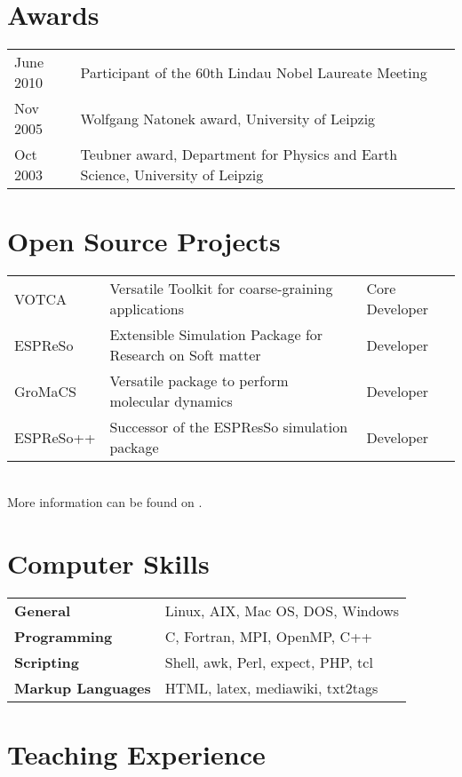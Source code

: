 \documentclass{article}
\begin{document}
\section*{Awards}

\begin{tabular}{ll}
June 2010 & Participant of the 60th Lindau Nobel Laureate Meeting\\
Nov 2005  & Wolfgang Natonek award, University of Leipzig\\
Oct 2003  & Teubner award, Department for Physics and Earth Science, University of Leipzig\\
\end{tabular}

\section*{Open Source Projects}

\begin{tabular}{lll}
VOTCA & Versatile Toolkit for coarse-graining applications & Core Developer \\
ESPReSo & Extensible Simulation Package for Research on Soft matter & Developer \\
GroMaCS & Versatile package to perform molecular dynamics & Developer \\
ESPReSo++ & Successor of the ESPResSo simulation package & Developer \\
\end{tabular}\\

More information can be found on .

\section*{Computer Skills}

\begin{tabular}{ll}
\textbf{General} & Linux, AIX, Mac OS, DOS, Windows \\
\textbf{Programming} & C, Fortran, MPI, OpenMP, C++ \\
\textbf{Scripting} & Shell, awk, Perl, expect, PHP, tcl \\
\textbf{Markup Languages} & HTML, latex, mediawiki, txt2tags \\
\end{tabular}

\section*{Teaching Experience}
\end{document}
